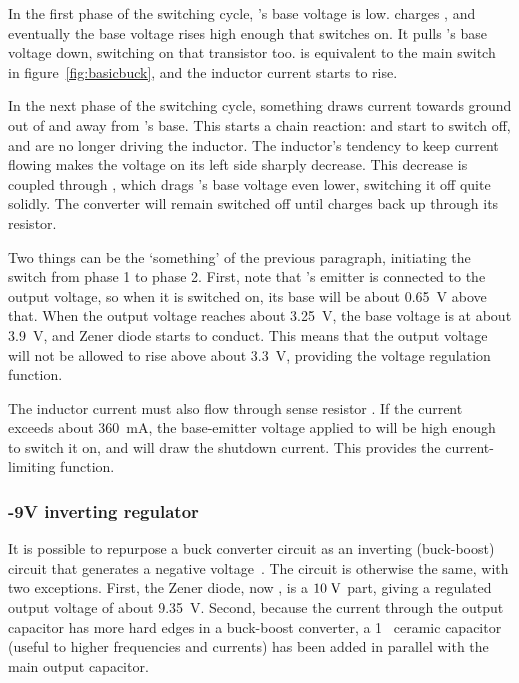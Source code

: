 In the first phase of the switching cycle, 's base voltage is
low.  charges , and eventually the base voltage rises
high enough that  switches on. It pulls 's base voltage
down, switching on that transistor too.  is equivalent to the main
switch in figure~\ref{fig:basicbuck}, and the inductor current starts to rise.

In the next phase of the switching cycle, something draws current towards ground
out of  and away from 's base. This starts a chain reaction:
 and  start to switch off, and are no longer driving the
inductor. The inductor's tendency to keep current flowing makes the voltage on its
left side sharply decrease. This decrease is coupled through , which
drags 's base voltage even lower, switching it off quite solidly.
The converter will remain switched off until  charges back up through
its resistor.

Two things can be the `something' of the previous paragraph, initiating the
switch from phase 1 to phase 2. First, note that 's emitter is
connected to the output voltage, so when it is switched on, its base will be
about 0.65~V above that. When the output voltage reaches about
3.25~V, the base voltage is at about 3.9~V, and Zener diode
 starts to conduct. This means that the output voltage will not be
allowed to rise above about 3.3~V, providing the voltage regulation
function.

The inductor current must also flow through sense resistor . If the
current exceeds about 360~mA, the base-emitter voltage applied to
 will be high enough to switch it on, and  will draw the
shutdown current. This provides the current-limiting function.

\subsubsection{-9V inverting regulator}
It is possible to repurpose a buck converter circuit as an inverting
(buck-boost) circuit that generates a negative voltage~\cite{buckinv}. The
circuit is otherwise the same, with two exceptions. First, the Zener diode, now
, is a $10\;\mathrm{V}$ part, giving a regulated output voltage of
about 9.35~V. Second, because the current through the output capacitor
has more hard edges in a buck-boost converter, a 1~\uF{} ceramic
capacitor (useful to higher frequencies and currents) has been added in
parallel with the main output capacitor.

